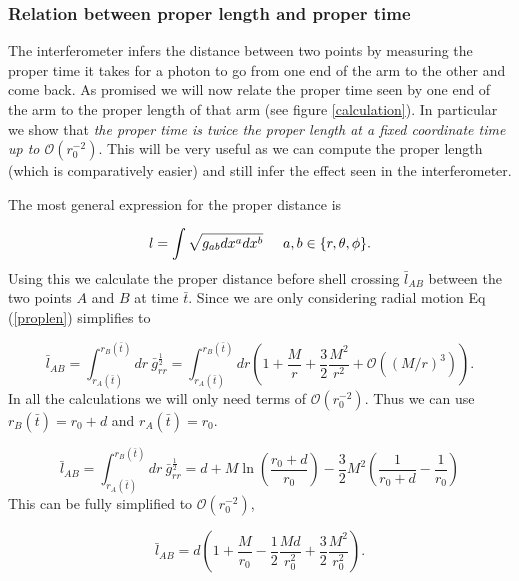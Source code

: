 \documentclass[aps,showpacs,onecolumn,floats,prd,superscriptaddress,nofootinbib]{revtex4-1}
\begin{document}
\subsubsection{Relation between proper length and proper time}

The interferometer infers the distance between two points by measuring the proper time it takes for a photon to go from one end of the arm to the other and come back. As promised we will now relate the proper time seen by one end of the arm to the proper length of that arm (see figure \ref{calculation}). 
In particular we show that \emph{the proper time is twice the proper length at a fixed coordinate time up to $\mathcal{O}(r_0^{-2})$}. This will be very useful as we can compute the proper length (which is comparatively easier) and still infer the effect seen in the interferometer.

 The most general expression for the proper distance is 

\begin{equation}
	l = \int \sqrt{g_{ab} dx^a dx^b} \hspace{5mm} a,b \in \{r,\theta,\phi\}.	\label{proplen}
\end{equation}
Using this we calculate the proper distance before shell crossing $\bar{l}_{AB}$ between the two points $A$ and $B$ at time $\bar{t}$. Since we are only considering radial motion Eq (\ref{proplen}) simplifies to

\begin{equation}
	\bar{l}_{AB} = \int^{r_B(\bar{t})}_{r_A(\bar{t})} dr \ \bar{g}_{rr}^\frac{1}{2}  = \int^{r_B(\bar{t})}_{r_A(\bar{t})} dr \left( 1 + \frac{M}{r} + \frac{3}{2} \frac{M^2}{r^2}  + \mathcal{O}((M/r)^3) \right).
\end{equation}
In all the calculations we will only need terms of $\mathcal{O}(r_0^{-2})$. Thus we can use $r_B(\bar{t}) = r_0 + d$ and $r_A(\bar{t})  = r_0$. 

\begin{equation}
	 \bar{l}_{AB} =  \int^{r_B(\bar{t})}_{r_A(\bar{t})}  dr \ \bar{g}_{rr}^\frac{1}{2}  = d + M \ln \left( \frac{r_0 + d}{r_0} \right) - \frac{3}{2} M^2 \left( \frac{1}{r_0 + d} - \frac{1}{r_0} \right)
\end{equation}
This can be fully simplified to $\mathcal{O}(r_0^{-2})$,

\begin{equation}
	 \bar{l}_{AB} =  d \left( 1 + \frac{M}{r_0} - \frac{1}{2} \frac{Md}{r_0^2} + \frac{3}{2} \frac{M^2}{r_0^2} \right).
\end{equation}
\end{document}
